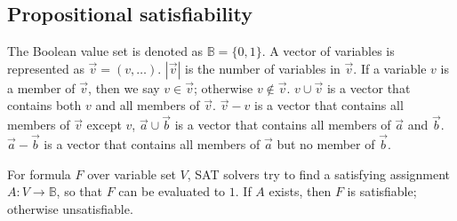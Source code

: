 \documentclass[conference]{IEEEtran}
\begin{document}
\subsection{Propositional satisfiability}\label{subsec_SAT}
The Boolean value set is denoted as $\mathbb{B}=\{0,1\}$.
A vector of variables is represented as $\vec{v}=(v,\dots)$.
$|\vec{v}|$ is the number of variables in $\vec{v}$. 
If a variable $v$ is a member of $\vec{v}$,
then we say $v\in\vec{v}$;
otherwise $v\notin\vec{v}$.
$v\cup\vec{v}$ is a vector that contains both $v$ and all members of $\vec{v}$.
$\vec{v}-v$ is a vector that contains all members of $\vec{v}$ except $v$,
$\vec{a}\cup\vec{b}$ is a vector that contains  all members of $\vec{a}$ and $\vec{b}$.
$\vec{a}-\vec{b}$ is a vector that contains  all members of $\vec{a}$ but no member of $\vec{b}$.



For formula $F$ over variable set $V$,
SAT solvers try to find a satisfying assignment $A:V\to \mathbb{B}$,
so that $F$ can be evaluated to $1$.
If $A$ exists, then $F$ is satisfiable;
otherwise unsatisfiable.

 



\end{document}
